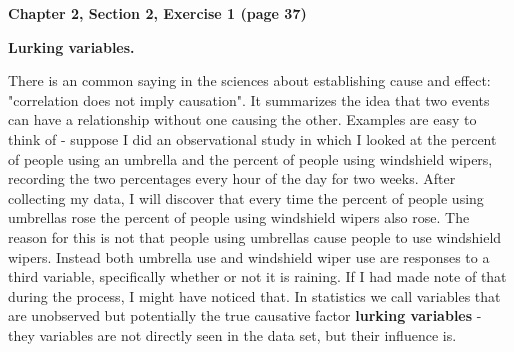 \documentclass[11pt]{article}\usepackage[]{graphicx}\usepackage[]{color}
\renewcommand{\ans}[1]{}
\begin{document}
\item \textbf{Chapter 2, Section 2, Exercise 1 (page 37)}

\ans{Following the process described in Lecture 3:

   \begin{itemize}
      \item  $ N = 38$,
      \item  $ n = 5$,
      \item  $ m = 2$,
   \end{itemize}

   The instructions tell us to repeat the selection process where the previous process ended. 
   The first two rows of table B.1 are: 

   \texttt{    97842 69095 25982 03484 25173 05982 14624 31653 17170 92785} 

   \texttt{    53047 13486 69712 33567 82313 87631 03197 02438 12374 40329}

   Since $m = 2$ we can rewrite this as the two digit values we will be looking at:

   \texttt{    97 84 26 90 95 25 98 20 34 84 25 17 30 59 82 14 62 43 16 53 17 17 09 27 85 } 

   \texttt{    53 04 71 34 86 69 71 23 35 67 82 31 38 76 31 03 19 70 24 38 12 37 44 03 29 }

   Working left to right, keeping new entries that are between 1 and 36 gives us the following samples:

   \begin{itemize}
      \item Sample 1:  26, 25, 20, 34, 25
      \item Sample 2:  17, 30, 14, 16, 09
      \item Sample 2:  27, 04, 34, 23, 35
      \item Sample 2:  31, 38, 31, 03, 19
   \end{itemize}

}

\item \textbf{Lurking variables.}

   There is an common saying in the sciences about establishing cause and effect: "correlation does not imply causation". 
   It summarizes the idea that two events can have a relationship without one causing the other.
   Examples are easy to think of - suppose I did an observational study in which I looked at the percent of people using an umbrella and the percent of people using windshield wipers, recording the two percentages every hour of the day for two weeks.
   After collecting my data, I will discover that every time the percent of people using umbrellas rose the percent of people using windshield wipers also rose. 
   The reason for this is not that people using umbrellas cause people to use windshield wipers.
   Instead both umbrella use and windshield wiper use are responses to a third variable, specifically whether or not it is raining.
   If I had made note of that during the process, I might have noticed that.
   In statistics we call variables that are unobserved but potentially the true causative factor \textbf{lurking variables} - they variables are not directly seen in the data set, but their influence is.
\end{document}
